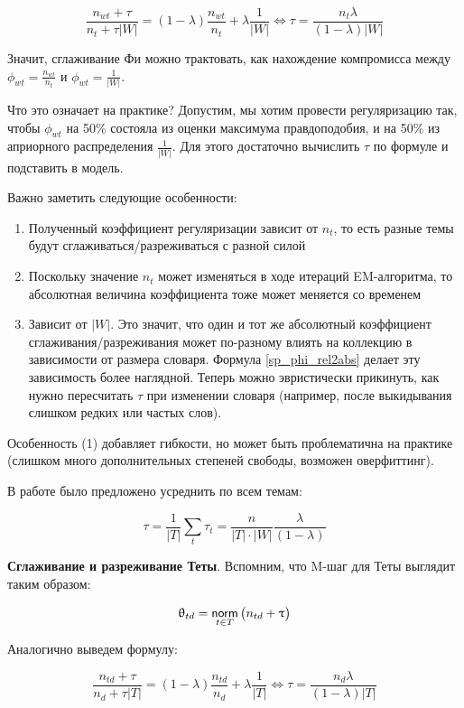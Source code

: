 \[
\frac{n_{wt} + \tau}{n_{t} + \tau |W|} = (1-\lambda) \frac{n_{wt}}{n_t} + \lambda \frac{1}{|W|} \iff \tau  = \frac{n_t \lambda}{(1-\lambda) |W|} \label{sp_phi_rel2abs} 
\]

Значит, сглаживание Фи можно трактовать, как нахождение компромисса между $\phi_{wt} = \frac{n_{wt}}{n_t}$ и $\phi_{wt} = \frac{1}{|W|}$. 

Что это означает на практике? Допустим, мы хотим провести регуляризацию так, чтобы $\phi_{wt}$ на 50\% состояла из оценки максимума правдоподобия, и на 50\% из априорного распределения $\frac{1}{|W|}$. Для этого достаточно вычислить $\tau$ по формуле и подставить в модель.

Важно заметить следующие особенности: 

\begin{enumerate}
    \item  {Полученный коэффициент регуляризации зависит от $n_t$, то есть разные темы будут сглаживаться/разреживаться с разной силой}
    \item  {Поскольку значение $n_t$ может изменяться в ходе итераций EM-алгоритма, то абсолютная величина коэффициента тоже может меняется со временем}
    \item  {Зависит от $|W|$. Это значит, что один и тот же абсолютный коэффициент сглаживания/разреживания может по-разному влиять на коллекцию в зависимости от размера словаря.  Формула \ref{sp_phi_rel2abs} делает эту зависимость более наглядной. Теперь можно эвристически прикинуть, как нужно пересчитать $\tau$ при изменении словаря (например, после выкидывания слишком редких или частых слов).}
\end{enumerate}

Особенность (1) добавляет гибкости, но может быть проблематична на практике (слишком много дополнительных степеней свободы, возможен оверфиттинг).

В работе \cite{doykov} было предложено усреднить по всем темам:

\[
\tau = \frac{1}{|T|} \sum_t \tau_t = \frac{n}{|T|\cdot|W|} \frac{\lambda}{(1-\lambda)}
\]

\textbf{Сглаживание и разреживание Теты}. Вспомним, что M-шаг для Теты выглядит таким образом:

\[
\uptheta_{td} = \mathop{\mathsf{norm}}\limits_{t \in T} \big( n_{td} + \uptau \big)
\]

Аналогично выведем формулу:

\[
\frac{n_{td} + \tau}{n_d + \tau |T|} = (1-\lambda) \frac{n_{td}}{n_d} + \lambda \frac{1}{|T|} \iff \tau = \frac{n_d \lambda}{(1-\lambda) |T|} \label{sp_theta_rel2abs} 
\]

